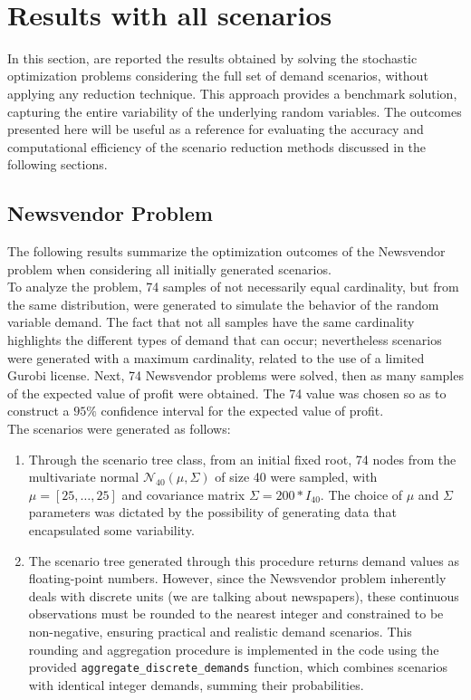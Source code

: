 \documentclass[a4paper,12pt]{article}
\begin{document}
	\
	
	\section{Results with all scenarios}
	
	In this section, are reported the results obtained by solving the stochastic optimization problems considering the full set of demand scenarios, without applying any reduction technique. This approach provides a benchmark solution, capturing the entire variability of the underlying random variables. The outcomes presented here will be useful as a reference for evaluating the accuracy and computational efficiency of the scenario reduction methods discussed in the following sections.
	
	
	\subsection{Newsvendor Problem}
	
	The following results summarize the optimization outcomes of the Newsvendor problem when considering all initially generated scenarios.\\
	
	\noindent To analyze the problem, 74 samples of not necessarily equal cardinality, but from the same distribution, were generated to simulate the behavior of the random variable demand. The fact that not all samples have the same cardinality highlights the different types of demand that can occur; nevertheless scenarios were generated with a maximum cardinality, related to the use of a limited Gurobi license. Next, 74 Newsvendor problems were solved, then as many samples of the expected value of profit were obtained. The 74 value was chosen so as to construct a $95\%$ confidence interval for the expected value of profit. \\
	
	\noindent The scenarios were generated as follows: 
	\begin{enumerate}
		\item Through the scenario tree class, from an initial fixed root, 74 nodes from the multivariate normal $\mathcal{N}_{40}(\mu, \Sigma)$ of size 40 were sampled, with $\mu = [25,\dots,25]$ and covariance matrix $\Sigma = 200 * I_{40}$. The choice of $\mu$ and $\Sigma$ parameters was dictated by the possibility of generating data that encapsulated some variability. 
		
		\item The scenario tree generated through this procedure returns demand values as floating-point numbers. However, since the Newsvendor problem inherently deals with discrete units (we are talking about newspapers), these continuous observations must be rounded to the nearest integer and constrained to be non-negative, ensuring practical and realistic demand scenarios. This rounding and aggregation procedure is implemented in the code using the provided \texttt{aggregate\_discrete\_demands} function, which combines scenarios with identical integer demands, summing their probabilities.
		
	\end{enumerate}
	
\end{document}
